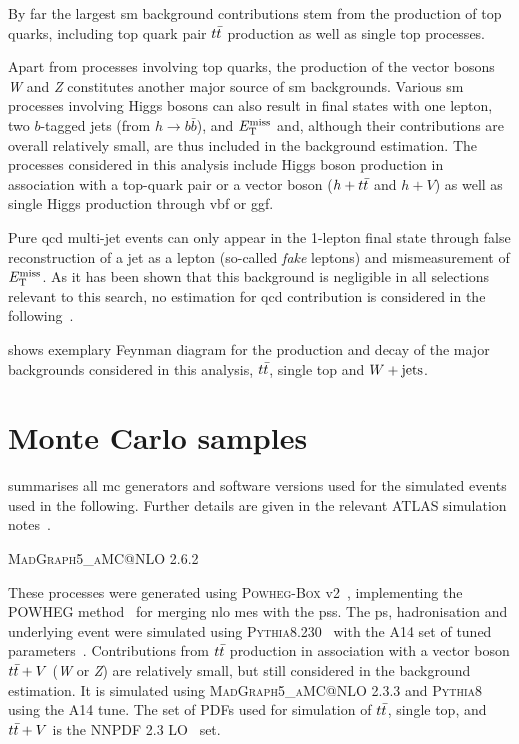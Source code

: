 By far the largest \gls{sm} background contributions stem from the production of top quarks, including top quark pair $t\bar{t}$ production as well as single top processes. 

Apart from processes involving top quarks, the production of the vector bosons \textit{W} and \textit{Z} constitutes another major source of \gls{sm} backgrounds. 
Various \gls{sm} processes involving Higgs bosons can also result in final states with one lepton, two $b$-tagged jets (from $h\rightarrow b\bar{b}$), and $E_{\textrm{T}}^{\textrm{miss}}$ and, although their contributions are overall relatively small, are thus included in the background estimation. The processes considered in this analysis include Higgs boson production in association with a top-quark pair or a vector boson ($h+t\bar{t}$ and $h+V$) as well as single Higgs production through \gls{vbf} or \gls{ggf}. 

Pure \gls{qcd} multi-jet events can only appear in the 1-lepton final state through false reconstruction of a jet as a lepton (so-called \textit{fake} leptons) and mismeasurement of $E_{\textrm{T}}^{\textrm{miss}}$. As it has been shown that this background is negligible in all selections relevant to this search, no estimation for \gls{qcd} contribution is considered in the following~\cite{SUSY-2019-08}.

 shows exemplary Feynman diagram for the production and decay of the major backgrounds considered in this analysis, $t\bar{t}$, single top and $W+\mathrm{jets}$.

\section{Monte Carlo samples}

 summarises all \gls{mc} generators and software versions used for the simulated events used in the following. Further details are given in the relevant ATLAS simulation notes~\cite{ATL-PHYS-PUB-2018-009,ATL-PHYS-PUB-2016-005,ATL-PHYS-PUB-2017-006,ATL-PHYS-PUB-2017-005,ATL-PHYS-PUB-2016-002}.


\textsc{MadGraph5\_aMC@NLO} 2.6.2~\cite{MGaMCNLO:2014hca,Frederix:2012ps}

These processes were generated using \textsc{Powheg-Box} v2~\cite{PowhegBox:2010xd}, implementing the \textsc{POWHEG} method~\cite{Powheg1,Powheg2} for merging \gls{nlo} \glspl{me} with the \glspl{ps}. The \gls{ps}, hadronisation and underlying event were simulated using \textsc{Pythia8.230}~\cite{Pythia8:2007gs} with the A14 set of tuned parameters~\cite{ATL-PHYS-PUB-2014-021}. Contributions from $t\bar{t}$ production in association with a vector boson $t\bar{t}+V$ (\textit{W} or \textit{Z}) are relatively small, but still considered in the background estimation. It is simulated using \textsc{MadGraph5\_aMC@NLO} 2.3.3 and \textsc{Pythia8} using the A14 tune. The set of \glspl{PDF} used for simulation of $t\bar{t}$, single top, and $t\bar{t}+V$ is the NNPDF 2.3 LO~\cite{Ball:2012cx} set.

